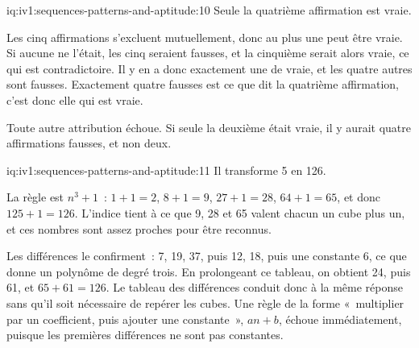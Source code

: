 \begin{solution}{iq:iv1:sequences-patterns-and-aptitude:10}
Seule la quatrième affirmation est vraie.

Les cinq affirmations s'excluent mutuellement, donc au plus une peut être vraie. Si aucune ne l'était, les cinq seraient fausses, et la cinquième serait alors vraie, ce qui est contradictoire. Il y en a donc exactement une de vraie, et les quatre autres sont fausses. Exactement quatre fausses est ce que dit la quatrième affirmation, c'est donc elle qui est vraie.

Toute autre attribution échoue. Si seule la deuxième était vraie, il y aurait quatre affirmations fausses, et non deux.

\end{solution}

\begin{solution}{iq:iv1:sequences-patterns-and-aptitude:11}
Il transforme 5 en 126.

La règle est $n^3 + 1$~: $1 + 1 = 2$, $8 + 1 = 9$, $27 + 1 = 28$, $64 + 1 = 65$, et donc $125 + 1 = 126$. L'indice tient à ce que 9, 28 et 65 valent chacun un cube plus un, et ces nombres sont assez proches pour être reconnus.

Les différences le confirment~: 7, 19, 37, puis 12, 18, puis une constante 6, ce que donne un polynôme de degré trois. En prolongeant ce tableau, on obtient 24, puis 61, et $65 + 61 = 126$. Le tableau des différences conduit donc à la même réponse sans qu'il soit nécessaire de repérer les cubes. Une règle de la forme «~multiplier par un coefficient, puis ajouter une constante~», $an + b$, échoue immédiatement, puisque les premières différences ne sont pas constantes.

\end{solution}

